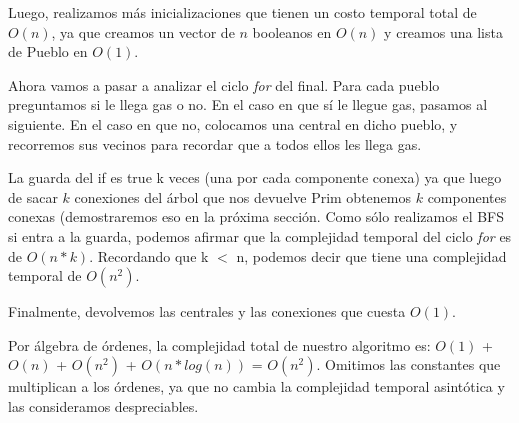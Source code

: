 Luego, realizamos más inicializaciones que tienen un costo temporal total de $O(n)$, ya que creamos un vector de $n$ booleanos en $O(n)$ y creamos una lista de Pueblo en $O(1)$.

Ahora vamos a pasar a analizar el ciclo \emph{for} del final. Para cada pueblo preguntamos si le llega gas o no. En el caso en que sí le llegue gas, pasamos al siguiente. En el caso en que no, colocamos una central en dicho pueblo, y recorremos sus vecinos para recordar que a todos ellos les llega gas.

La guarda del if es true k veces (una por cada componente conexa) ya que luego de sacar $k$ conexiones del árbol que nos devuelve Prim obtenemos $k$ componentes conexas (demostraremos eso en la próxima sección. Como sólo realizamos el BFS si entra a la guarda, podemos afirmar que la complejidad temporal del ciclo \emph{for} es de $O(n*k)$. Recordando que k $<$ n, podemos decir que tiene una complejidad temporal de $O(n^2)$.

Finalmente, devolvemos las centrales y las conexiones que cuesta $O(1)$.

Por álgebra de órdenes, la complejidad total de nuestro algoritmo es: $O(1)$ + $O(n)$ + $O(n^2)$ + $O(n*log(n))$ = $O(n^2)$. Omitimos las constantes que multiplican a los órdenes, ya que no cambia la complejidad temporal asintótica y las consideramos despreciables.
